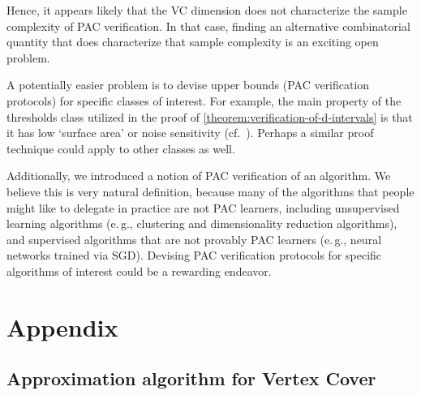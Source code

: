 \documentclass[11pt]{article}
\newcommand{\eg}{e.\,g.}
\begin{document}
Hence, it appears likely that the VC dimension does not characterize the sample complexity of PAC verification. In that case, finding an alternative combinatorial quantity that does characterize that sample complexity is an exciting open problem. 

A potentially easier problem is to devise upper bounds (PAC verification protocols) for specific classes of interest. For example, the main property of the thresholds class utilized in the proof of \cref{theorem:verification-of-d-intervals} is that it has low `surface area' or noise sensitivity (cf.\ \cite{BalcanBBY12}). Perhaps a similar proof technique could apply to other classes as well.

Additionally, we introduced a notion of PAC verification of an algorithm. We believe this is very natural definition, because many of the algorithms that people
might like to delegate in practice are not PAC learners, including unsupervised learning algorithms
(\eg, clustering and dimensionality reduction algorithms), and supervised algorithms that are not provably PAC learners (\eg, neural networks trained via SGD). Devising PAC verification protocols for specific algorithms of interest could be a rewarding endeavor.


%
%

%

%

%

%
\section{Appendix}   %

%

%

%
%
\subsection{Approximation algorithm for Vertex Cover} %
\end{document}
